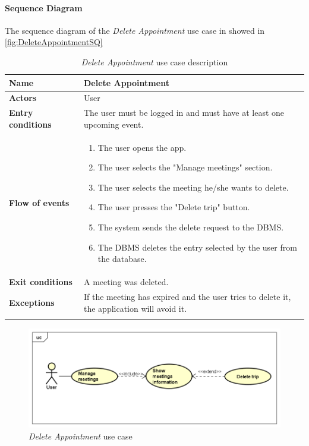 \paragraph*{Sequence Diagram\\}
The sequence diagram of the \emph{Delete Appointment} use case in showed in \autoref{fig:DeleteAppointmentSQ}
\newpage
\begin{longtable}{p{0.25\linewidth}|p{0.75\linewidth}}
	\hline
		\label{tab:DeleteAppointmentTAB}
	\textbf{Name} & \textbf{Delete Appointment} \\
	\hline
	\textbf{Actors} & User \\
	\hline
	\textbf{Entry conditions} & The user must be logged in and must have at least one upcoming event.\\
	\hline
	\textbf{Flow of events} & 
	\begin{enumerate}
		\item The user opens the app.
		\item The user selects the "Manage meetings" section.
		\item The user selects the meeting he/she wants to delete.
		\item The user presses the "Delete trip" button.
		\item The system sends the delete request to the DBMS.
		\item The DBMS deletes the entry selected by the user from the database.
	\end{enumerate}\\
	\hline
	\textbf{Exit conditions} & A meeting was deleted.\\
	\hline
	\textbf{Exceptions} & If the meeting has expired and the user tries to delete it, the application will avoid it. \\
	\hline
	\caption{\emph{Delete Appointment} use case description}
\end{longtable}

\begin{figure}[h]
	\includegraphics[width=\textwidth]{Img/DeleteAppointmentUC}
	\caption{\emph{Delete Appointment} use case}
	\label{fig:DeleteAppointmentUC}
\end{figure}

